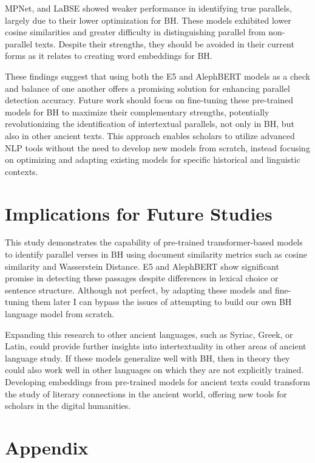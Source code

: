 \documentclass[12pt]{article}
\begin{document}
MPNet, and LaBSE showed weaker performance in identifying true parallels, largely due to their lower optimization for BH. These models exhibited lower cosine similarities and greater difficulty in distinguishing parallel from non-parallel texts. Despite their strengths, they should be avoided in their current forms as it relates to creating word embeddings for BH.

These findings suggest that using both the E5 and AlephBERT models as a check and balance of one another offers a promising solution for enhancing parallel detection accuracy. Future work should focus on fine-tuning these pre-trained models for BH to maximize their complementary strengths, potentially revolutionizing the identification of intertextual parallels, not only in BH, but also in other ancient texts. This approach enables scholars to utilize advanced NLP tools without the need to develop new models from scratch, instead focusing on optimizing and adapting existing models for specific historical and linguistic contexts.

\section{Implications for Future Studies}
This study demonstrates the capability of pre-trained transformer-based models to identify parallel verses in BH using document similarity metrics such as cosine similarity and Wasserstein Distance. E5 and AlephBERT show significant promise in detecting these passages despite differences in lexical choice or sentence structure. Although not perfect, by adapting these models and fine-tuning them later I can bypass the issues of attempting to build our own BH language model from scratch.

Expanding this research to other ancient languages, such as Syriac, Greek, or Latin, could provide further insights into intertextuality in other areas of ancient language study. If these models generalize well with BH, then in theory they could also work well in other languages on which they are not explicitly trained.  Developing embeddings from pre-trained models for ancient texts could transform the study of literary connections in the ancient world, offering new tools for scholars in the digital humanities.

\clearpage
\appendix
\section*{Appendix}
\end{document}

